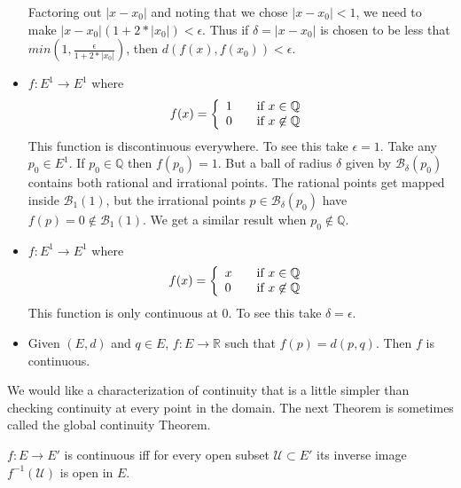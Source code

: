 \begin{itemize}
	Factoring out $\lvert x-x_0 \rvert$ and noting that we chose $\lvert x-x_0 \rvert < 1$, we need to
	make $\lvert x-x_0 \rvert ( 1 + 2*\lvert x_0\rvert) < \epsilon$. Thus if $\delta = \lvert x - x_0
	\rvert$ is chosen to be less that $min(1 , \frac{\epsilon}{1 + 2*\lvert x_0\rvert})$, then 
	$d(f(x),f(x_0)) < \epsilon$.
    \item $f : E^1 \to E^1$ where
	\[ f(x) = \left\{ 
	    \begin{array}{l l}
		1 & \quad \text{if $x \in \mathbb{Q}$ }\\
		0 & \quad \text{if $x \not \in \mathbb{Q}$ }
	\end{array} \right.\]
	This function is discontinuous everywhere. To see this take $\epsilon = 1$. Take any $p_0 \in E^1$.
	If $p_0 \in \mathbb{Q}$ then $f(p_0) = 1$. But a ball of radius $\delta$ given by
	$\mathcal{B}_{\delta}(p_0)$ contains both rational and irrational points. The rational points get
	mapped inside $\mathcal{B}_{1}(1)$, but the irrational points $p \in \mathcal{B}_{\delta}(p_0) $ 
	have $f(p) = 0 \not \in \mathcal{B}_{1}(1)$. We get a similar result when $p_0 \not \in \mathbb{Q}$.

    \item $f : E^1 \to E^1$ where
	\[ f(x) = \left\{ 
	    \begin{array}{l l}
		x & \quad \text{if $x \in \mathbb{Q}$ }\\
		0 & \quad \text{if $x \not \in \mathbb{Q}$ }
	\end{array} \right.\]
	This function is only continuous at $0$. To see this take $\delta = \epsilon$.

    \item Given $(E,d)$ and $q \in E$, $f : E \to \mathbb{R}$ such that $f(p) = d(p,q)$. Then $f$ is
	continuous.
\end{itemize}
We would like a characterization of continuity that is a little simpler than checking continuity at
every point in the domain. The next Theorem is sometimes called the global continuity Theorem. 
\begin{Theorem}[name=Global Continuity Theorem]
    $f : E \to E'$ is continuous iff for every open subset $\mathcal{U} \subset E'$ its inverse
    image $f^{-1}(\mathcal{U})$ is open in $E$.
\end{Theorem}
